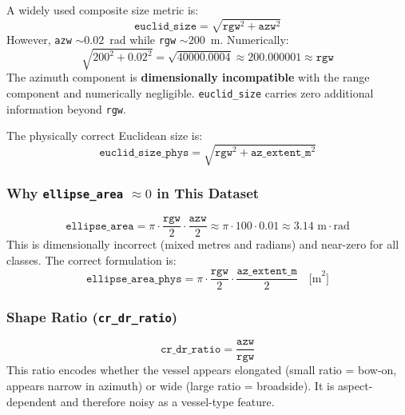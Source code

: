 \documentclass[journal]{IEEEtran}
\begin{document}
A widely used composite size metric is:
\begin{equation}
  \texttt{euclid\_size} = \sqrt{\texttt{rgw}^2 + \texttt{azw}^2}
\end{equation}
However, \texttt{azw} $\sim 0.02$~rad while \texttt{rgw} $\sim 200$~m.
Numerically:
\begin{equation}
  \sqrt{200^2 + 0.02^2} = \sqrt{40000.0004} \approx 200.000001 \approx \texttt{rgw}
\end{equation}
The azimuth component is \textbf{dimensionally incompatible} with the range
component and numerically negligible. \texttt{euclid\_size} carries zero
additional information beyond \texttt{rgw}.

The physically correct Euclidean size is:
\begin{equation}
  \texttt{euclid\_size\_phys} = \sqrt{\texttt{rgw}^2 + \texttt{az\_extent\_m}^2}
\end{equation}

\subsubsection{Why \texttt{ellipse\_area} $\approx 0$ in This Dataset}

\begin{equation}
  \texttt{ellipse\_area} = \pi \cdot \frac{\texttt{rgw}}{2} \cdot \frac{\texttt{azw}}{2}
  \approx \pi \cdot 100 \cdot 0.01 \approx 3.14 \text{ m}\cdot\text{rad}
\end{equation}
This is dimensionally incorrect (mixed metres and radians) and near-zero for all
classes. The correct formulation is:
\begin{equation}
  \texttt{ellipse\_area\_phys} = \pi \cdot \frac{\texttt{rgw}}{2} \cdot
  \frac{\texttt{az\_extent\_m}}{2} \quad \text{[m}^2\text{]}
\end{equation}

\subsubsection{Shape Ratio (\texttt{cr\_dr\_ratio})}

\begin{equation}
  \texttt{cr\_dr\_ratio} = \frac{\texttt{azw}}{\texttt{rgw}}
\end{equation}
This ratio encodes whether the vessel appears elongated (small ratio = bow-on,
appears narrow in azimuth) or wide (large ratio = broadside). It is
aspect-dependent and therefore noisy as a vessel-type feature.
\end{document}
